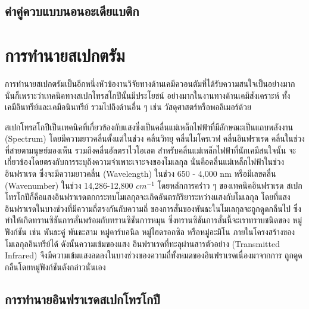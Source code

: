\subsection{ค่าคู่ควบแบบนอนอะเดียแบติก}
\label{ssec:nonadia_coupling}



\section{การทำนายสเปกตรัม}
\label{sec:pred_spectra}

การทำนายสเปกตรัมเป็นอีกหนึ่งหัวข้องานวิจัยทางด้านเคมีควอนตัมที่ได้รับความสนใจเป็นอย่างมากนั่นก็เพราะว่าเทคนิคทางสเปกโทรสโกปีนั้นมีประโยชน์%
อย่างมากในงานทางด้านเคมีสังเคราะห์ ทั้งเคมีอินทรีย์และเคมีอนินทรีย์ รวมไปถึงด้านอื่น ๆ เช่น วัสดุศาสตร์หรือพอลิเมอร์ด้วย 

สเปกโทรสโกปีเป็นเทคนิคที่เกี่ยวข้องกับแสงซึ่งเป็นคลื่นแม่เหล็กไฟฟ้าที่มีลักษณะเป็นแถบพลังงาน (Spectrum) โดยมีความยาวคลื่นตั้งแต่ในช่วง 
คลื่นวิทยุ คลื่นไมโครเวฟ คลื่นอินฟราเรด คลื่นในช่วงที่สายตามนุษย์มองเห็น รวมถึงคลื่นอัลตราไวโอเลต สำหรับคลื่นแม่เหล็กไฟฟ้าที่นักเคมีสนใจนั้น%
จะเกี่ยวข้องโดยตรงกับการระบุถึงความจำเพาะเจาะจงของโมเลกุล นั่นคือคลื่นแม่เหล็กไฟฟ้าในช่วงอินฟราเรด ซึ่งจะมีความยาวคลื่น (Wavelength) 
ในช่วง 650 - 4,000 nm หรือมีเลขคลื่น (Wavenumber) ในช่วง 14,286-12,800 $cm^{-1}$ โดยหลักการคร่าว ๆ ของเทคนิคอินฟราเรด%
สเปกโทรโกปีก็คือแสงอินฟราเรดตกกระทบโมเลกุลจะเกิดอันตรกิริยาระหว่างแสงกับโมเลกุล โดยที่แสงอินฟราเรดในบางช่วงที่มีความถี่ตรงกันกับความถี่%
ของการสั่นของพันธะในโมเลกุลจะถูกดูดกลืนไป ซึ่งทำให้เกิดทรานซิชันการสั่นพร้อมกับทรานซิชันการหมุน ซึ่งทรานซิชันการสั่นนี้จะเราทราบชนิดของ%
หมู่ฟังก์ชัน เช่น พันธะคู่ พันธะสาม หมู่คาร์บอนิล หมู่ไฮดรอกซิล หรือหมู่อะมิโน ภายในโครงสร้างของโมเลกุลอินทรีย์ได้ ดังนั้นความเข้มของแสง%
อินฟราเรดที่ทะลุผ่านสารตัวอย่าง (Transmitted Infrared) จึงมีความเข้มแสงลดลงในบางช่วงของความถี่ทั้งหมดของอินฟราเรดเนื่องมาจากการ%
ถูกดูดกลืนโดยหมู่ฟังก์ชันดังกล่าวนั่นเอง

\subsection{การทำนายอินฟราเรดสเปกโทรโกปี}
\label{ssec:pred_spec_ir}

